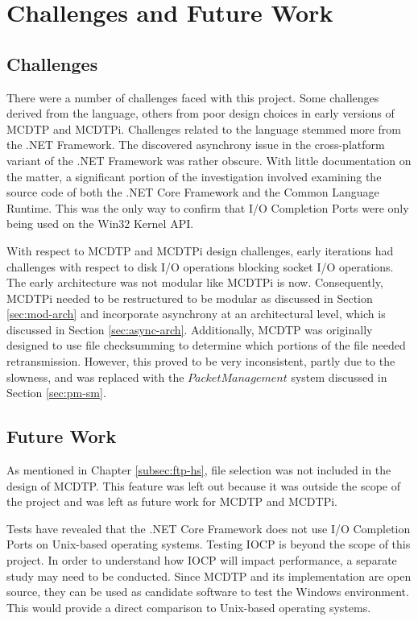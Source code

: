 \chapter{Challenges and Future Work}\label{chp:c-fw}

\section{Challenges}

There were a number of challenges faced with this project. Some challenges derived from the language, others from poor design choices in early versions of MCDTP and MCDTPi. Challenges related to the language stemmed more from the .NET Framework. The discovered asynchrony issue in the cross-platform variant of the .NET Framework was rather obscure. With little documentation on the matter, a significant portion of the investigation involved examining the source code of both the .NET Core Framework and the Common Language Runtime. This was the only way to confirm that I/O Completion Ports were only being used on the Win32 Kernel API.

With respect to MCDTP and MCDTPi design challenges, early iterations had challenges with respect to disk I/O operations blocking socket I/O operations. The early architecture was not modular like MCDTPi is now. Consequently, MCDTPi needed to be restructured to be modular as discussed in Section \ref{sec:mod-arch} and incorporate asynchrony at an architectural level, which is discussed in Section \ref{sec:async-arch}. Additionally, MCDTP was originally designed to use file checksumming to determine which portions of the file needed retransmission. However, this proved to be very inconsistent, partly due to the slowness, and was replaced with the $PacketManagement$ system discussed in Section \ref{sec:pm-sm}.

\section{Future Work}

As mentioned in Chapter \ref{subsec:ftp-hs}, file selection was not included in the design of MCDTP. This feature was left out because it was outside the scope of the project and was left as future work for MCDTP and MCDTPi.

Tests have revealed that the .NET Core Framework does not use I/O Completion Ports on Unix-based operating systems. Testing IOCP is beyond the scope of this project. In order to understand how IOCP will impact performance, a separate study may need to be conducted. Since MCDTP and its implementation are open source, they can be used as candidate software to test the Windows environment. This would provide a direct comparison to Unix-based operating systems.

